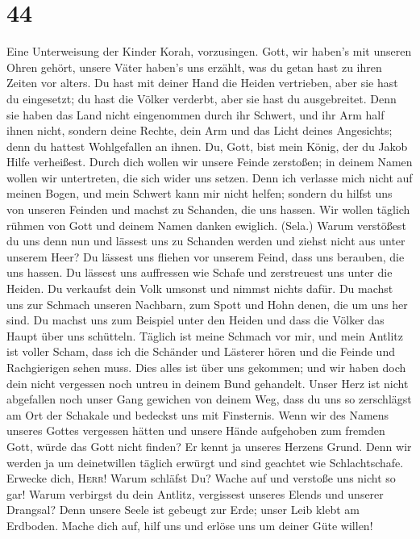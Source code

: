 \hypertarget{section-43}{%
\section{44}\label{section-43}}

 Eine Unterweisung der Kinder Korah, vorzusingen.
 Gott, wir haben's mit unseren Ohren gehört, unsere Väter
haben's uns erzählt, was du getan hast zu ihren Zeiten vor alters.
 Du hast mit deiner Hand die Heiden vertrieben, aber sie
hast du eingesetzt; du hast die Völker verderbt, aber sie hast du
ausgebreitet.  Denn sie haben das Land nicht eingenommen
durch ihr Schwert, und ihr Arm half ihnen nicht, sondern deine Rechte,
dein Arm und das Licht deines Angesichts; denn du hattest Wohlgefallen
an ihnen.  Du, Gott, bist mein König, der du Jakob Hilfe
verheißest.  Durch dich wollen wir unsere Feinde
zerstoßen; in deinem Namen wollen wir untertreten, die sich wider uns
setzen.  Denn ich verlasse mich nicht auf meinen Bogen,
und mein Schwert kann mir nicht helfen;  sondern du hilfst
uns von unseren Feinden und machst zu Schanden, die uns hassen.
 Wir wollen täglich rühmen von Gott und deinem Namen
danken ewiglich. (Sela.)  Warum verstößest du uns denn
nun und lässest uns zu Schanden werden und ziehst nicht aus unter
unserem Heer?  Du lässest uns fliehen vor unserem Feind,
dass uns berauben, die uns hassen.  Du lässest uns
auffressen wie Schafe und zerstreuest uns unter die Heiden.
 Du verkaufst dein Volk umsonst und nimmst nichts dafür.
 Du machst uns zur Schmach unseren Nachbarn, zum Spott
und Hohn denen, die um uns her sind.  Du machst uns zum
Beispiel unter den Heiden und dass die Völker das Haupt über uns
schütteln.  Täglich ist meine Schmach vor mir, und mein
Antlitz ist voller Scham,  dass ich die Schänder und
Lästerer hören und die Feinde und Rachgierigen sehen muss.
 Dies alles ist über uns gekommen; und wir haben doch
dein nicht vergessen noch untreu in deinem Bund gehandelt.
 Unser Herz ist nicht abgefallen noch unser Gang gewichen
von deinem Weg,  dass du uns so zerschlägst am Ort der
Schakale und bedeckst uns mit Finsternis.  Wenn wir des
Namens unseres Gottes vergessen hätten und unsere Hände aufgehoben zum
fremden Gott,  würde das Gott nicht finden? Er kennt ja
unseres Herzens Grund.  Denn wir werden ja um
deinetwillen täglich erwürgt und sind geachtet wie Schlachtschafe.
 Erwecke dich, \textsc{Herr}! Warum schläfst Du? Wache
auf und verstoße uns nicht so gar!  Warum verbirgst du
dein Antlitz, vergissest unseres Elends und unserer Drangsal?
 Denn unsere Seele ist gebeugt zur Erde; unser Leib klebt
am Erdboden.  Mache dich auf, hilf uns und erlöse uns um
deiner Güte willen!

